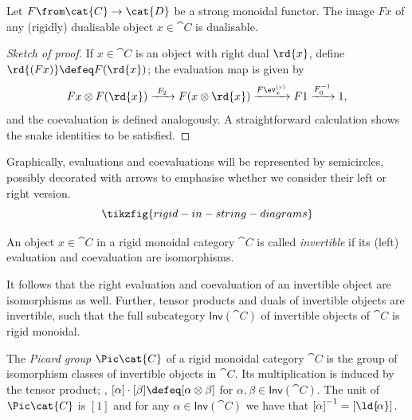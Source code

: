 \begin{lemma}\label{lem:transfer-of-rigidity}
  Let \(F \from \cat{C} \to \cat{D}\) be a strong monoidal functor. The image \(Fx\) of any (rigidly) dualisable object \(x \in\cat{C}\) is dualisable.
\end{lemma}
\begin{proof}[Sketch of proof]
  If \(x \in \cat{C}\) is an object with right dual \(\rd{x}\),
  define \(\rd{(Fx)} \defeq F(\rd{x})\);
  the evaluation map is given by
  \[
    Fx \otimes F(\rd{x}) \xrightarrow{\ F_2\ } F(x \otimes \rd{x}) \xrightarrow{F \ev^{(r)}_x} F1 \xrightarrow{F_0^{-1}} 1,
  \]
  and the coevaluation is defined analogously.
  A straightforward calculation shows the snake identities to be satisfied.
\end{proof}

Graphically, evaluations and coevaluations will be represented by semicircles,
possibly decorated with arrows to emphasise whether we consider their left or right version.
\[
  \tikzfig{rigid-in-string-diagrams}
\]

\begin{definition}\label{def: invertible_objects}
  An object \(x \in \cat{C}\) in a rigid monoidal category \(\cat{C}\) is called \emph{invertible} if its (left) evaluation and coevaluation are isomorphisms.
\end{definition}

It follows that the right evaluation and coevaluation of an invertible object are isomorphisms as well.
Further, tensor products and duals of invertible objects are invertible,
such that the full subcategory \(\mathsf{Inv}(\cat{C})\) of invertible objects of \(\cat{C}\) is rigid monoidal.

\begin{definition}\label{def: invertible_object}
  The \emph{Picard group} \(\Pic \cat{C}\) of a rigid monoidal category \(\cat{C}\) is the group of isomorphism classes of invertible objects in \(\cat{C}\).
  Its multiplication is induced by the tensor product; \ie, \([\alpha] \cdot [\beta] \defeq [\alpha \otimes \beta]\) for \(\alpha, \beta \in \mathsf{Inv}(\cat{C})\).
  The unit of \(\Pic \cat{C}\) is \([1]\) and for any \(\alpha \in \mathsf{Inv}(\cat{C})\) we have that \({[\alpha]}^{-1} =[\ld{\!\alpha}]\).
\end{definition}

